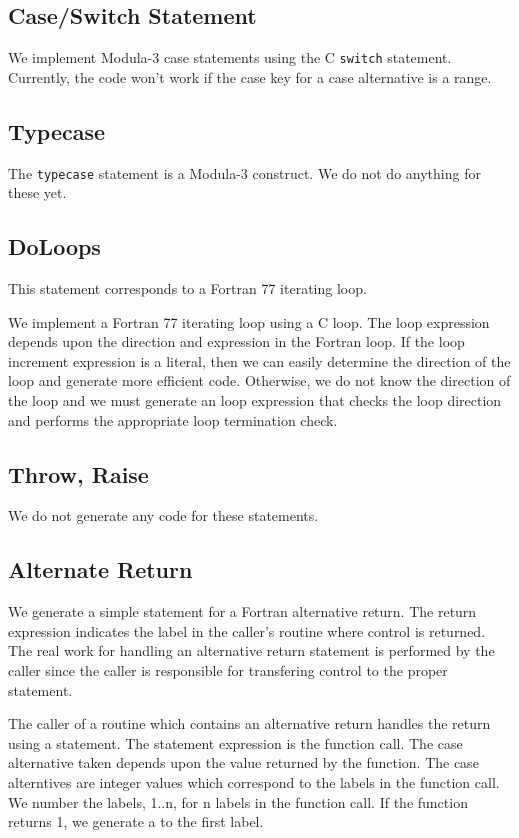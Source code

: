 \subsection{Case/Switch Statement}

We implement Modula-3 case statements using the C {\tt switch}
statement.  Currently, the code won't work if the case key for a case
alternative is a range.

\subsection{Typecase}

The {\tt typecase} statement is a Modula-3 construct.
We do not do anything for these yet.

\subsection{DoLoops}

This statement corresponds to a Fortran 77 iterating loop.

We implement a Fortran 77 iterating loop using a C  loop.
The  loop expression depends upon the direction and
expression in the Fortran loop.  If the loop increment expression is a
literal, then we can easily determine the direction of the loop and
generate more efficient code.  Otherwise, we do not know the direction
of the loop and we must generate an  loop expression that
checks the loop direction and performs the appropriate loop
termination check.

\subsection{Throw, Raise}

We do not generate any code for these statements.

\subsection{Alternate Return}

We generate a simple  statement for a Fortran alternative
return.  The return expression indicates the label in the caller's
routine where control is returned.  The real work for handling an
alternative return statement is performed by the caller since
the caller is responsible for transfering control to the 
proper statement.

The caller of a routine which contains an alternative return handles
the return using a  statement.  The  statement
expression is the function call.  The case alternative taken depends
upon the value returned by the function.  The case alterntives are
integer values which correspond to the labels in the function call.
We number the labels, 1..n, for n labels in the function call.
If the function returns 1, we generate a  to the first
label. 

